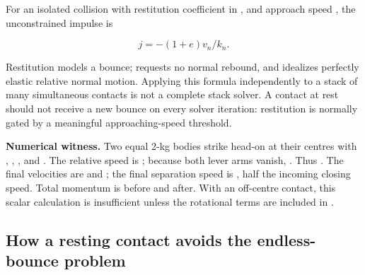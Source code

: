For an isolated collision with restitution coefficient  in \BookInlineCode{{{[}}{0}{,}{1}{{]}}}{{[}0,1{]}}, and approach speed , the unconstrained impulse is

\[
j=-(1+e)v_n/k_n.
\]

Restitution models a bounce;  requests no normal rebound, and  idealizes perfectly elastic relative normal motion. Applying this formula independently to a stack of many simultaneous contacts is not a complete stack solver. A contact at rest should not receive a new bounce on every solver iteration: restitution is normally gated by a meaningful approaching-speed threshold.

\textbf{Numerical witness.} Two equal 2-kg bodies strike head-on at their centres with , , , and . The relative speed is ; because both lever arms vanish, . Thus . The final velocities are  and ; the final separation speed is , half the incoming closing speed. Total momentum is  before and  after. With an off-centre contact, this scalar calculation is insufficient unless the rotational terms are included in .

\subsection{How a resting contact avoids the endless-bounce problem}\label{02-foundations-ii-ch039-how-a-resting-contact-avoids-the-endless-bounce-problem}

\hypertarget{02-foundations-ii-ch039-how-a-resting-contact-avoids-the-endless-bounce-problem}{}

